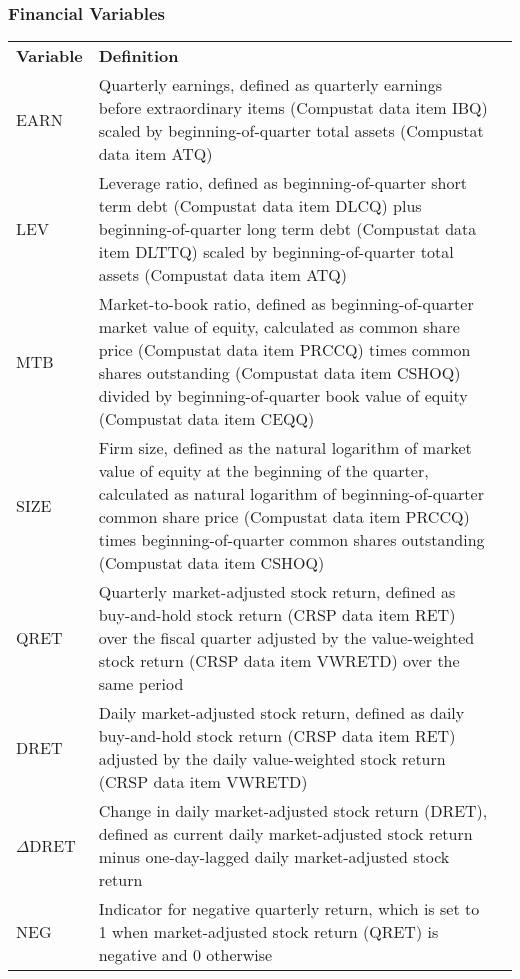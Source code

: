 \subsubsection*{Financial Variables}
\begin{table}[H]
	\centering
	\begin{tabular}{lp{15cm}p{15cm}}
		\midrule
		\midrule
		\textbf{Variable} & \textbf{Definition} \\
		EARN & Quarterly earnings, defined as quarterly earnings before extraordinary items (Compustat data item IBQ) scaled by beginning-of-quarter total assets (Compustat data item ATQ) \\
		LEV & Leverage ratio, defined as beginning-of-quarter short term debt (Compustat data item DLCQ) plus beginning-of-quarter long term debt (Compustat data item DLTTQ) scaled by beginning-of-quarter total assets (Compustat data item ATQ) \\
		MTB & Market-to-book ratio, defined as beginning-of-quarter market value of equity, calculated as common share price (Compustat data item PRCCQ) times common shares outstanding (Compustat data item CSHOQ) divided by beginning-of-quarter book value of equity (Compustat data item CEQQ) \\
		SIZE & Firm size, defined as the natural logarithm of market value of equity at the beginning of the quarter, calculated as natural logarithm of beginning-of-quarter common share price (Compustat data item PRCCQ) times beginning-of-quarter common shares outstanding (Compustat data item CSHOQ) \\
		QRET & Quarterly market-adjusted stock return, defined as buy-and-hold stock return (CRSP data item RET) over the fiscal quarter adjusted by the value-weighted stock return (CRSP data item VWRETD) over the same period \\
		DRET & Daily market-adjusted stock return, defined as daily buy-and-hold stock return (CRSP data item RET) adjusted by the daily value-weighted stock return (CRSP data item VWRETD)\\
		$\Delta$DRET & Change in daily market-adjusted stock return (DRET), defined as current daily market-adjusted stock return minus one-day-lagged daily market-adjusted stock return \\
		NEG & Indicator for negative quarterly return, which is set to 1 when market-adjusted stock return (QRET) is negative and 0 otherwise \\

\end{tabular}
\end{table}
